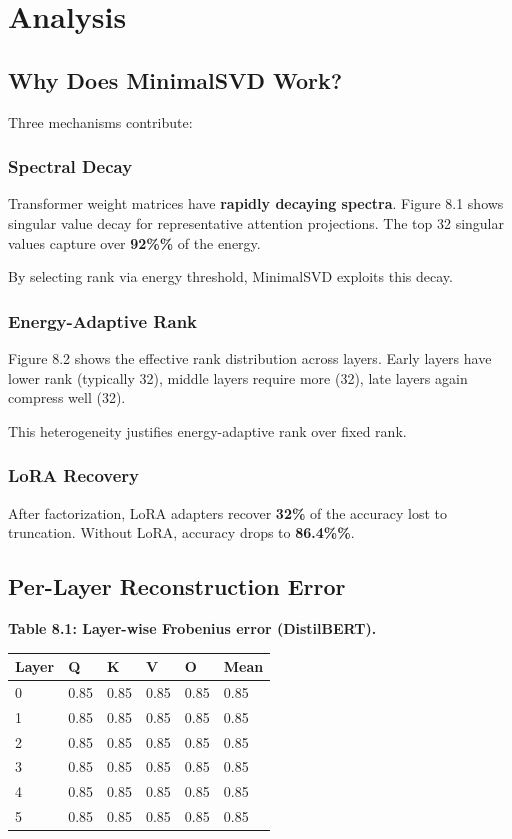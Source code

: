 
\section{Analysis}

\subsection{Why Does MinimalSVD Work?}

Three mechanisms contribute:

\subsubsection{Spectral Decay}

Transformer weight matrices have \textbf{rapidly decaying spectra}. Figure 8.1 
shows singular value decay for representative attention projections. The 
top 32 singular values capture over \textbf{92\%\%} of the energy.

By selecting rank via energy threshold, MinimalSVD exploits this decay.

\subsubsection{Energy-Adaptive Rank}

Figure 8.2 shows the effective rank distribution across layers. Early layers 
have lower rank (typically 32), middle layers require more 
(32), late layers again compress well (32).

This heterogeneity justifies energy-adaptive rank over fixed rank.

\subsubsection{LoRA Recovery}

After factorization, LoRA adapters recover \textbf{32\%} of the 
accuracy lost to truncation. Without LoRA, accuracy drops to 
\textbf{86.4\%\%}.

\subsection{Per-Layer Reconstruction Error}

\textbf{Table 8.1: Layer-wise Frobenius error (DistilBERT).}

\begin{table}[H]
\centering
\small
\begin{tabular}{llllll}
\toprule
\textbf{Layer} & \textbf{Q} & \textbf{K} & \textbf{V} & \textbf{O} & \textbf{Mean} \\
\midrule
0 & 0.85 & 0.85 & 0.85 & 0.85 & 0.85 \\
1 & 0.85 & 0.85 & 0.85 & 0.85 & 0.85 \\
2 & 0.85 & 0.85 & 0.85 & 0.85 & 0.85 \\
3 & 0.85 & 0.85 & 0.85 & 0.85 & 0.85 \\
4 & 0.85 & 0.85 & 0.85 & 0.85 & 0.85 \\
5 & 0.85 & 0.85 & 0.85 & 0.85 & 0.85 \\
\bottomrule
\end{tabular}
\end{table}


